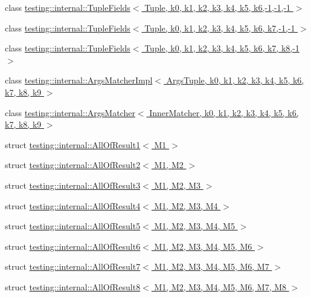 \begin{DoxyCompactItemize}
class \hyperlink{classtesting_1_1internal_1_1TupleFields_3_01Tuple_00_01k0_00_01k1_00_01k2_00_01k3_00_01k4_00_01k5_00_01k6_00-1_00-1_00-1_01_4}{testing\+::internal\+::\+Tuple\+Fields$<$ Tuple, k0, k1, k2, k3, k4, k5, k6,-\/1,-\/1,-\/1 $>$}
\item 
class \hyperlink{classtesting_1_1internal_1_1TupleFields_3_01Tuple_00_01k0_00_01k1_00_01k2_00_01k3_00_01k4_00_01k58e55129982dcbf796bc09f321e253b2}{testing\+::internal\+::\+Tuple\+Fields$<$ Tuple, k0, k1, k2, k3, k4, k5, k6, k7,-\/1,-\/1 $>$}
\item 
class \hyperlink{classtesting_1_1internal_1_1TupleFields_3_01Tuple_00_01k0_00_01k1_00_01k2_00_01k3_00_01k4_00_01k7d05709aed2fdf4fd2f884d75b9bd5cd}{testing\+::internal\+::\+Tuple\+Fields$<$ Tuple, k0, k1, k2, k3, k4, k5, k6, k7, k8,-\/1 $>$}
\item 
class \hyperlink{classtesting_1_1internal_1_1ArgsMatcherImpl}{testing\+::internal\+::\+Args\+Matcher\+Impl$<$ Args\+Tuple, k0, k1, k2, k3, k4, k5, k6, k7, k8, k9 $>$}
\item 
class \hyperlink{classtesting_1_1internal_1_1ArgsMatcher}{testing\+::internal\+::\+Args\+Matcher$<$ Inner\+Matcher, k0, k1, k2, k3, k4, k5, k6, k7, k8, k9 $>$}
\item 
struct \hyperlink{structtesting_1_1internal_1_1AllOfResult1}{testing\+::internal\+::\+All\+Of\+Result1$<$ M1 $>$}
\item 
struct \hyperlink{structtesting_1_1internal_1_1AllOfResult2}{testing\+::internal\+::\+All\+Of\+Result2$<$ M1, M2 $>$}
\item 
struct \hyperlink{structtesting_1_1internal_1_1AllOfResult3}{testing\+::internal\+::\+All\+Of\+Result3$<$ M1, M2, M3 $>$}
\item 
struct \hyperlink{structtesting_1_1internal_1_1AllOfResult4}{testing\+::internal\+::\+All\+Of\+Result4$<$ M1, M2, M3, M4 $>$}
\item 
struct \hyperlink{structtesting_1_1internal_1_1AllOfResult5}{testing\+::internal\+::\+All\+Of\+Result5$<$ M1, M2, M3, M4, M5 $>$}
\item 
struct \hyperlink{structtesting_1_1internal_1_1AllOfResult6}{testing\+::internal\+::\+All\+Of\+Result6$<$ M1, M2, M3, M4, M5, M6 $>$}
\item 
struct \hyperlink{structtesting_1_1internal_1_1AllOfResult7}{testing\+::internal\+::\+All\+Of\+Result7$<$ M1, M2, M3, M4, M5, M6, M7 $>$}
\item 
struct \hyperlink{structtesting_1_1internal_1_1AllOfResult8}{testing\+::internal\+::\+All\+Of\+Result8$<$ M1, M2, M3, M4, M5, M6, M7, M8 $>$}

\end{DoxyCompactItemize}
